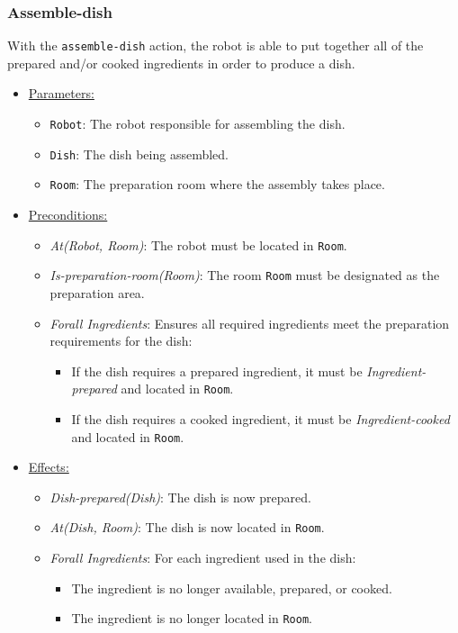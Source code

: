 \documentclass{article}
\begin{document}
\subsubsection{Assemble-dish}
With the \texttt{assemble-dish} action, the robot is able to put together all of the prepared and/or cooked ingredients in order to produce a dish.
\begin{itemize}
    \item \underline{Parameters:}
    \begin{itemize}
        \item \texttt{Robot}: The robot responsible for assembling the dish.
        \item \texttt{Dish}: The dish being assembled.
        \item \texttt{Room}: The preparation room where the assembly takes place.
    \end{itemize}
    \item \underline{Preconditions:}
    \begin{itemize}
        \item \textit{At(Robot, Room)}: The robot must be located in \texttt{Room}.
        \item \textit{Is-preparation-room(Room)}: The room \texttt{Room} must be designated as the preparation area.
        \item \textit{Forall Ingredients}: Ensures all required ingredients meet the preparation requirements for the dish:
        \begin{itemize}
            \item If the dish requires a prepared ingredient, it must be \textit{Ingredient-prepared} and located in \texttt{Room}.
            \item If the dish requires a cooked ingredient, it must be \textit{Ingredient-cooked} and located in \texttt{Room}.
        \end{itemize}
    \end{itemize}
    \item \underline{Effects:}
    \begin{itemize}
        \item \textit{Dish-prepared(Dish)}: The dish is now prepared.
        \item \textit{At(Dish, Room)}: The dish is now located in \texttt{Room}.
        \item \textit{Forall Ingredients}: For each ingredient used in the dish:
        \begin{itemize}
            \item The ingredient is no longer available, prepared, or cooked.
            \item The ingredient is no longer located in \texttt{Room}.
        \end{itemize}
    \end{itemize}
\end{itemize}
\end{document}
